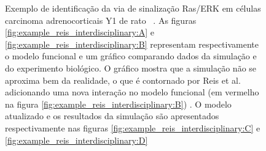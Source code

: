 \documentclass[12pt]{article}
\begin{document}
\begin{figure}[h]
    \centering

        
    \caption{Exemplo de identificação da via de sinalização Ras/ERK em
    células carcinoma adrenocorticais Y1 de rato 
    ~\cite{Reis2017interdisciplinary}. As figuras 
    \ref{fig:example_reis_interdisciplinary:A} e 
    \ref{fig:example_reis_interdisciplinary:B} representam 
    respectivamente o modelo funcional e um gráfico comparando dados da
    simulação e do experimento biológico. O gráfico mostra que a 
    simulação não se aproxima bem da realidade, o que é contornado por
    Reis et al. adicionando uma nova interação no modelo funcional 
    (em vermelho na figura \ref{fig:example_reis_interdisciplinary:B})
    . O modelo atualizado e os resultados da simulação são apresentados
    respectivamente nas figuras 
    \ref{fig:example_reis_interdisciplinary:C} e
    \ref{fig:example_reis_interdisciplinary:D}} 
    \label{fig:example_reis_interdisciplinary} 
\end{figure}
\FloatBarrier
\end{document}
